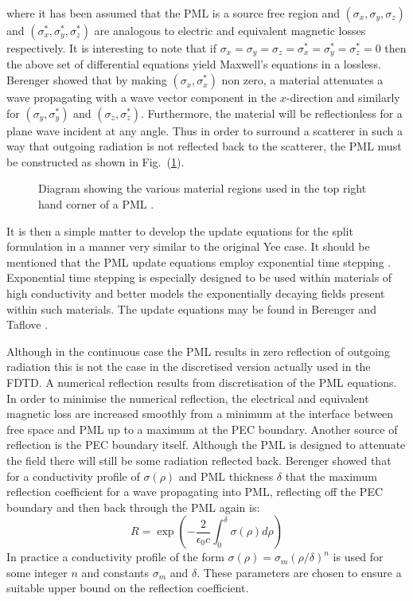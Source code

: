 \documentclass[a4paper, 12pt]{article}
\newcommand{\rfig}[1]{Fig.\ (\ref{#1})}
\begin{document}
	where it has been assumed that the PML is a source free region and
	$(\sigma_x,\sigma_y,\sigma_z)$ and $(\sigma_x^*,\sigma_y^*,\sigma_z^*)$ are
	analogous to electric and equivalent magnetic losses respectively. It is interesting
	to note that if
	$\sigma_x=\sigma_y=\sigma_z=\sigma_x^*=\sigma_y^*=\sigma_z^*=0$ then
	the above set of differential equations yield Maxwell's
	equations in a lossless. Berenger showed that by making $(\sigma_x,\sigma_x^*)$ non
	zero, a material attenuates a wave propagating with a wave vector component in the
	$x$-direction and similarly for $(\sigma_y,\sigma_y^*)$ and
	$(\sigma_z,\sigma_z^*)$. Furthermore, the material will be
	reflectionless for a plane wave incident at any angle. Thus in order
	to surround a scatterer in such a way that outgoing radiation is not
	reflected back to the scatterer, the PML must be constructed as shown
	in \rfig{fig:fdtd:pml}.
	\begin{figure}[!h]
		\centering
		\caption{Diagram showing the various material regions used in the
			top right hand corner of a PML \cite{berenger96journalcopmphys363}.}
		\label{fig:fdtd:pml}
	\end{figure}
	It is then a simple matter to develop the update equations for the
	split formulation in a manner very similar to the original Yee
	case. It should be mentioned that the PML update equations employ
	exponential time stepping
	\cite{holland94ieeetranseleccompat32}. Exponential time stepping is
	especially designed to be used within materials of high conductivity
	and better models the exponentially decaying fields present within
	such materials. The update equations may be found in Berenger
	\cite{berenger96journalcopmphys363} and Taflove \cite{taflove00book}.

	Although in the continuous case the PML results in zero reflection of
	outgoing radiation this is not the case in the discretised version
	actually used in the FDTD. A numerical
	reflection results from discretisation of the PML equations. In order
	to minimise the numerical reflection, the electrical and equivalent
	magnetic loss are increased smoothly from a minimum at the interface
	between free space and PML up to a maximum at the PEC
	boundary. Another source of reflection is the PEC boundary
	itself. Although the PML is designed to attenuate the field there will
	still be some radiation reflected back. Berenger showed that for a conductivity profile of
	$\sigma(\rho)$ and PML thickness $\delta$ that the maximum reflection
	coefficient for a wave propagating into PML, reflecting off the PEC
	boundary and then back through the PML again is:
	\begin{equation}
		\label{eq:fdtd:pmlref}
		R = \exp\left(-\frac{2}{\epsilon_0c}\int_0^\delta\sigma(\rho)d\rho\right)
	\end{equation}
	In practice a conductivity profile of the form \cite{taflove95cetfdtdm}
	$\sigma(\rho)=\sigma_m(\rho/\delta)^n$ is used for some integer $n$
	and constants $\sigma_m$ and $\delta$. These parameters are chosen to
	ensure a suitable upper bound on the reflection coefficient.
\end{document}

